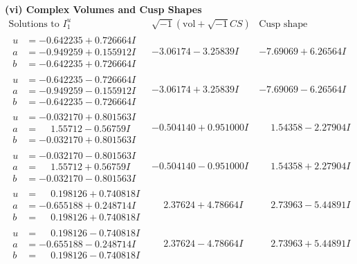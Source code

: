 \documentclass[1p]{elsarticle_modified}
\theoremstyle{definition}
\newcommand{\I}{\sqrt{-1}}
\begin{document}
\newpage\flushleft \textbf{(vi) Complex Volumes and Cusp Shapes}
$$\begin{array}{c|c|c}  
\text{Solutions to }I^u_{1}& \I (\text{vol} + \sqrt{-1}CS) & \text{Cusp shape}\\
 \hline 
\begin{aligned}
u &= -0.642235 + 0.726664 I \\
a &= -0.949259 + 0.155912 I \\
b &= -0.642235 + 0.726664 I\end{aligned}
 & -3.06174 - 3.25839 I & -7.69069 + 6.26564 I \\ \hline\begin{aligned}
u &= -0.642235 - 0.726664 I \\
a &= -0.949259 - 0.155912 I \\
b &= -0.642235 - 0.726664 I\end{aligned}
 & -3.06174 + 3.25839 I & -7.69069 - 6.26564 I \\ \hline\begin{aligned}
u &= -0.032170 + 0.801563 I \\
a &= \phantom{-}1.55712 - 0.56759 I \\
b &= -0.032170 + 0.801563 I\end{aligned}
 & -0.504140 + 0.951000 I & \phantom{-}1.54358 - 2.27904 I \\ \hline\begin{aligned}
u &= -0.032170 - 0.801563 I \\
a &= \phantom{-}1.55712 + 0.56759 I \\
b &= -0.032170 - 0.801563 I\end{aligned}
 & -0.504140 - 0.951000 I & \phantom{-}1.54358 + 2.27904 I \\ \hline\begin{aligned}
u &= \phantom{-}0.198126 + 0.740818 I \\
a &= -0.655188 + 0.248714 I \\
b &= \phantom{-}0.198126 + 0.740818 I\end{aligned}
 & \phantom{-}2.37624 + 4.78664 I & \phantom{-}2.73963 - 5.44891 I \\ \hline\begin{aligned}
u &= \phantom{-}0.198126 - 0.740818 I \\
a &= -0.655188 - 0.248714 I \\
b &= \phantom{-}0.198126 - 0.740818 I\end{aligned}
 & \phantom{-}2.37624 - 4.78664 I & \phantom{-}2.73963 + 5.44891 I \\ \hline\begin{aligned}

\end{aligned}
\end{array}$$
\end{document}

